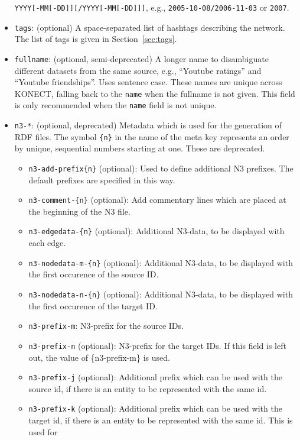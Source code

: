 \documentclass{article}
\begin{document}
\begin{itemize}
  \texttt{YYYY[-MM[-DD]][/YYYY[-MM[-DD]]]}, e.g., \texttt{2005-10-08/2006-11-03}
  or \texttt{2007}.
\item \texttt{tags}: (optional) A space-separated list of hashtags
  describing the network.  The list of tags is given in
  Section~\ref{sec:tags}.  
\item \texttt{fullname}: (optional, semi-deprecated) A longer name to disambiguate
  different datasets from the same source, e.g., ``Youtube
  ratings'' and ``Youtube friendships''.  Uses sentence case.  These
  names are unique across KONECT, falling back to the \texttt{name} when
  the fullname is not given.  This field is only recommended when the
  \texttt{name} field is not unique. 
\item \texttt{n3-*}: (optional, deprecated) Metadata which is used for the
  generation of RDF files. The symbol \texttt{\{n\}} in the name
  of the meta key represents an order by unique, sequential
  numbers starting at one.  These are deprecated. 
  \begin{itemize}
  \item \texttt{n3-add-prefix\{n\}} (optional):
    Used to define additional N3 prefixes. The
    default prefixes are specified in this way.
  \item \texttt{n3-comment-\{n\}} (optional): Add
    commentary lines which are placed at the
    beginning of the N3 file.
  \item \texttt{n3-edgedata-\{n\}} (optional):
    Additional N3-data, to be displayed with each
    edge.
  \item \texttt{n3-nodedata-m-\{n\}} (optional):
    Additional N3-data, to be displayed with the
    first occurence of the source ID.
  \item \texttt{n3-nodedata-n-\{n\}} (optional):
    Additional N3-data, to be displayed with the
    first occurence of the target ID.
  \item \texttt{n3-prefix-m}: N3-prefix for the
    source IDs.
  \item \texttt{n3-prefix-n} (optional): N3-prefix
    for the target IDs. If this field is left out,
    the value of \{n3-prefix-m\} is used.
  \item \texttt{n3-prefix-j} (optional):
    Additional prefix which can be used with the
    source id, if there is an entity to be
    represented with the same id.
  \item \texttt{n3-prefix-k} (optional):
    Additional prefix which can be used with the
    target id, if there is an entity to be
    represented with the same id. This is used for

\end{itemize}
\end{itemize}
\end{document}

